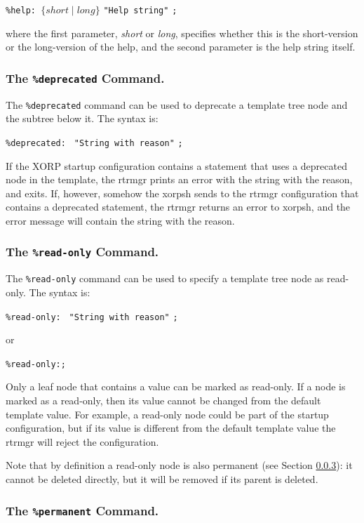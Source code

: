 \documentclass[11pt]{article}
\begin{document}
\texttt{\%help: }{$\{short \mid long\}$} \texttt{"Help string"} \texttt{;}

\noindent where the first parameter, \textit{short} or \textit{long},
specifies whether this is the short-version or the long-version of the
help, and the second parameter is the help string itself.

\subsubsection{The {\tt \%deprecated} Command.}

The {\tt \%deprecated} command can be used to deprecate a template tree
node and the subtree below it.
The syntax is:

\texttt{\%deprecated: } \texttt{"String with reason"} \texttt{;}

If the XORP startup configuration contains a statement that uses a
deprecated node in the template, the rtrmgr prints an error with
the string with the reason, and exits.
If, however, somehow the xorpsh sends to the rtrmgr configuration
that contains a deprecated statement, the rtrmgr returns an error to xorpsh,
and the error message will contain the string with the reason.

\subsubsection{The {\tt \%read-only} Command.}

The {\tt \%read-only} command can be used to specify a template tree
node as read-only.
The syntax is:

\texttt{\%read-only: } \texttt{"String with reason"} \texttt{;}

or

\texttt{\%read-only:;}

Only a leaf node that contains a value can be marked as read-only.
If a node is marked as a read-only, then its value cannot be
changed from the default template value. For example, a read-only
node could be part of the startup configuration, but if its
value is different from the default template value the rtrmgr
will reject the configuration.

Note that by definition a read-only node is also permanent
(see Section \ref{sec:permanent-command}):
it cannot be deleted directly, but it will be removed if its
parent is deleted.

\subsubsection{The {\tt \%permanent} Command.}
\label{sec:permanent-command}
\end{document}
